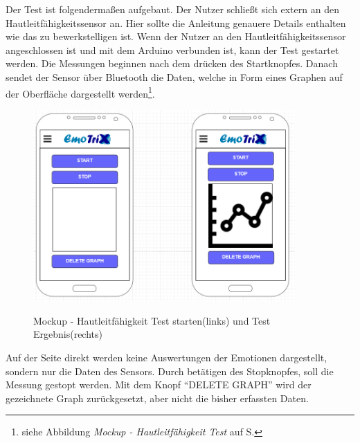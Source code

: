 Der Test ist folgendermaßen aufgebaut. Der Nutzer schließt sich extern an den Hautleitfähigkeitssensor an. Hier sollte die Anleitung genauere Details enthalten wie das zu bewerkstelligen ist. Wenn der Nutzer an den Hautleitfähigkeitssensor angeschlossen ist und mit dem Arduino verbunden ist, kann der Test gestartet werden. Die Messungen beginnen nach dem drücken des Startknopfes. Danach sendet der Sensor über Bluetooth die Daten, welche in Form eines Graphen auf der Oberfläche dargestellt werden\footnote{siehe Abbildung \textit{Mockup - Hautleitfähigkeit Test} auf S.\pageref{img:Mockup-GSR}}. 
\begin{figure}[h]
	\centering
	\includegraphics[width=10cm]{Bilder/Mockup-GSR.png}
	\label{img:Mockup-GSR}
	\caption[Mockup - Hautleitfähigkeit Test starten(links) und Test Ergebnis(rechts)]{Mockup - Hautleitfähigkeit Test starten(links) und Test Ergebnis(rechts)}
\end{figure}%
Auf der Seite direkt werden keine Auswertungen der Emotionen dargestellt, sondern nur die Daten des Sensors. Durch betätigen des Stopknopfes, soll die Messung gestopt werden. Mit dem Knopf ``DELETE GRAPH'' wird der gezeichnete Graph zurückgesetzt, aber nicht die bisher erfassten Daten.
